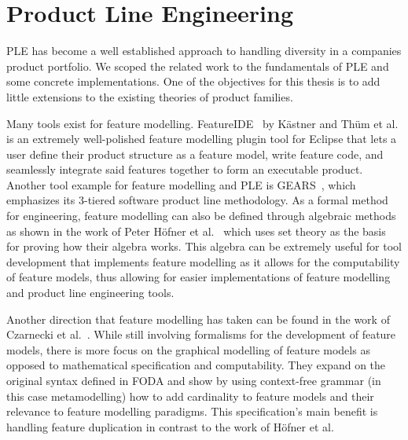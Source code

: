 















\section{Product Line Engineering}

\ac{PLE} has become a well established approach to handling diversity in a companies product portfolio. We scoped the related work to the fundamentals of \ac{PLE} and some concrete implementations. One of the objectives for this thesis is to add little extensions to the existing theories of product families.

Many tools exist for feature modelling. FeatureIDE~\cite{kastner2009featureide, thum2014featureide} by K\"{a}stner and Th{\"u}m et al. is an extremely well-polished feature modelling plugin tool for Eclipse that lets a user define their product structure as a feature model, write feature code, and seamlessly integrate said features together to form an executable product. Another tool example for feature modelling and PLE is GEARS~\cite{GEARS}, which emphasizes its 3-tiered software product line methodology. As a formal method for engineering, feature modelling can also be defined through algebraic methods as shown in the work of Peter H\"{o}fner et al.~\cite{hofner2006feature,hofner2011algebra} which uses set theory as the basis for proving how their algebra works. This algebra can be extremely useful for tool development that implements feature modelling as it allows for the computability of feature models, thus allowing for easier implementations of feature modelling and product line engineering tools.

Another direction that feature modelling has taken can be found in the work of Czarnecki et al.~\cite{czarnecki2004staged}. While still involving formalisms for the development of feature models, there is more focus on the graphical modelling of feature models as opposed to mathematical specification and computability. They expand on the original syntax defined in FODA and show by using context-free grammar (in this case metamodelling) how to add cardinality to feature models and their relevance to feature modelling paradigms. This specification's main benefit is handling feature duplication in contrast to the work of H\"{o}fner et al.

